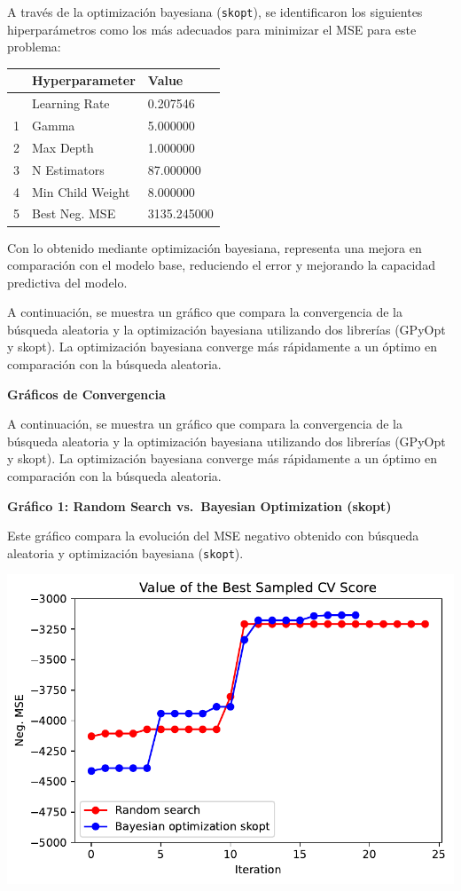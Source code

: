 \documentclass[
  12pt,
  letterpaper,
  DIV=11,
  numbers=noendperiod]{scrartcl}
\begin{document}
A través de la optimización bayesiana (\texttt{skopt}), se identificaron
los siguientes hiperparámetros como los más adecuados para minimizar el
MSE para este problema:

\begin{longtable}[]{@{}lll@{}}
\toprule\noalign{}
& Hyperparameter & Value \\
\midrule\noalign{}
\endhead
\bottomrule\noalign{}
\endlastfoot
0 & Learning Rate & 0.207546 \\
1 & Gamma & 5.000000 \\
2 & Max Depth & 1.000000 \\
3 & N Estimators & 87.000000 \\
4 & Min Child Weight & 8.000000 \\
5 & Best Neg. MSE & 3135.245000 \\
\end{longtable}

Con lo obtenido mediante optimización bayesiana, representa una mejora
en comparación con el modelo base, reduciendo el error y mejorando la
capacidad predictiva del modelo.

A continuación, se muestra un gráfico que compara la convergencia de la
búsqueda aleatoria y la optimización bayesiana utilizando dos librerías
(GPyOpt y skopt). La optimización bayesiana converge más rápidamente a
un óptimo en comparación con la búsqueda aleatoria.

\textbf{Gráficos de Convergencia}

A continuación, se muestra un gráfico que compara la convergencia de la
búsqueda aleatoria y la optimización bayesiana utilizando dos librerías
(GPyOpt y skopt). La optimización bayesiana converge más rápidamente a
un óptimo en comparación con la búsqueda aleatoria.

\textbf{Gráfico 1: Random Search vs.~Bayesian Optimization (skopt)}

Este gráfico compara la evolución del MSE negativo obtenido con búsqueda
aleatoria y optimización bayesiana (\texttt{skopt}).

\includegraphics{ProyFinal_OptBayesiana_2024_y_files/figure-pdf/cell-17-output-1.pdf}
\end{document}
